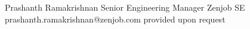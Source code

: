 
\vspace*{0.2cm}
\begin{referees}
		{Prashanth Ramakrishnan}
		{Senior Engineering Manager }
		{Zenjob SE}
		{prashanth.ramakrishnan@zenjob.com}
		{provided upon request}
\end{referees}